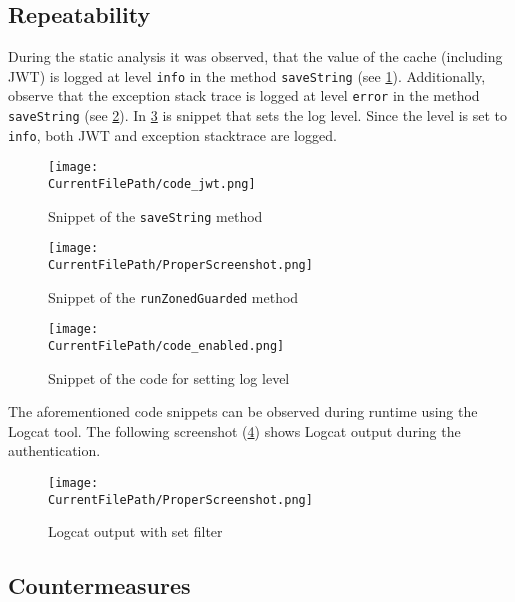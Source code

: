 \subsection*{Repeatability}

During the static analysis it was observed, that the value of the cache (including JWT) is logged at level \texttt{info} in the method \texttt{saveString} (see \cref{figure:code_jwt}).
Additionally, observe that the exception stack trace is logged at level \texttt{error} in the method \texttt{saveString} (see \cref{figure:code_exception}).
In \cref{figure:code_enabled} is snippet that sets the log level.
Since the level is set to \texttt{info}, both JWT  and exception stacktrace are logged.

\begin{figure}[H]
\centering
\texttt{[image: \\CurrentFilePath/code\_jwt.png]}
\caption{Snippet of the \texttt{saveString} method}
\label{figure:code_jwt}
\end{figure}

\begin{figure}[H]
\centering
\texttt{[image: \\CurrentFilePath/ProperScreenshot.png]}
\caption{Snippet of the \texttt{runZonedGuarded} method}
\label{figure:code_exception}
\end{figure}

\begin{figure}[H]
\centering
\texttt{[image: \\CurrentFilePath/code\_enabled.png]}
\caption{Snippet of the code for setting log level}
\label{figure:code_enabled}
\end{figure}

The aforementioned code snippets can be observed during runtime using the Logcat tool. 
The following screenshot (\cref{figure:logcat}) shows Logcat output during the authentication.

\begin{figure}[H]
\centering
\texttt{[image: \\CurrentFilePath/ProperScreenshot.png]}
\caption{Logcat output with set filter}
\label{figure:logcat}
\end{figure}




\subsection*{Countermeasures}

